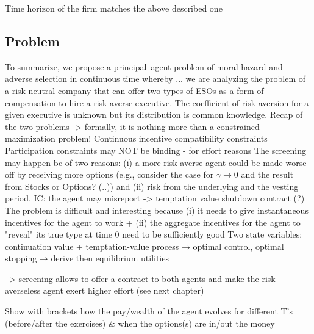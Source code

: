 Time horizon of the firm matches the above described one


\subsection{Problem}
To summarize, we propose a principal–agent problem of moral hazard and adverse selection in continuous time whereby ... we are analyzing the problem of a risk-neutral company that can offer two types of ESOs as a form of compensation to hire a risk-averse executive. The coefficient of risk aversion for a given executive is unknown but its distribution is common knowledge.
Recap of the two problems
-> formally, it is nothing more than a constrained maximization problem!
Continuous incentive compatibility constraints
Participation constraints may NOT be binding - for effort reasons
The screening may happen bc of two reasons: (i) a more risk-averse agent could be made worse off by receiving more options (e.g., consider the case for $\gamma \rightarrow 0$ and the result from Stocks or Options? (..)) and (ii) risk from the underlying and the vesting period.
IC: the agent may misreport -> temptation value
shutdown contract (?)
The problem is difficult and interesting because (i) it needs to give instantaneous incentives for the agent to work + (ii) the aggregate incentives for the agent to "reveal" its true type at time 0 need to be sufficiently good
Two state variables: continuation value + temptation-value process
→ optimal control, optimal stopping → derive then equilibrium utilities

--> screening allows to offer a contract to both agents and make the risk-averseless agent exert higher effort (see next chapter)

Show with brackets how the pay/wealth of the agent evolves for different T's (before/after the exercises) \& when the options(s) are in/out the money





